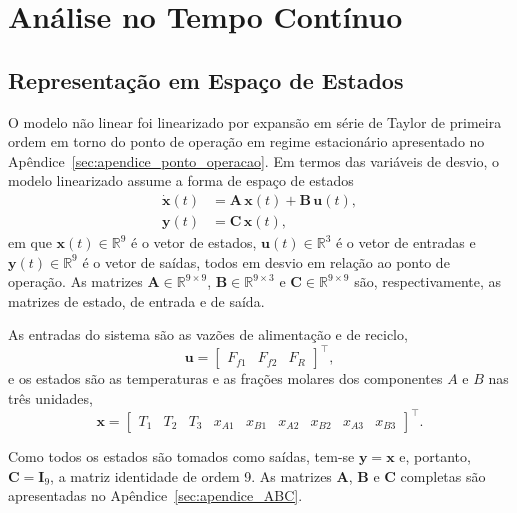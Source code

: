 \section{Análise no Tempo Contínuo}

\subsection{Representação em Espaço de Estados}

O modelo não linear foi linearizado por expansão em série de Taylor de primeira ordem em torno do ponto de operação em regime estacionário apresentado no Apêndice~\ref{sec:apendice_ponto_operacao}.
Em termos das variáveis de desvio, o modelo linearizado assume a forma de espaço de estados
\begin{align}
  \dot{\mathbf{x}}(t) & = \mathbf{A}\,\mathbf{x}(t) + \mathbf{B}\,\mathbf{u}(t), \\
  \mathbf{y}(t)       & = \mathbf{C}\,\mathbf{x}(t),
\end{align}
em que $\mathbf{x}(t) \in \mathbb{R}^{9}$ é o vetor de estados, $\mathbf{u}(t) \in \mathbb{R}^{3}$ é o vetor de entradas e $\mathbf{y}(t) \in \mathbb{R}^{9}$ é o vetor de saídas, todos em desvio em relação ao ponto de operação.
As matrizes $\mathbf{A} \in \mathbb{R}^{9 \times 9}$, $\mathbf{B} \in \mathbb{R}^{9 \times 3}$ e $\mathbf{C} \in \mathbb{R}^{9 \times 9}$ são, respectivamente, as matrizes de estado, de entrada e de saída.

As entradas do sistema são as vazões de alimentação e de reciclo,
\begin{equation}
  \mathbf{u} = \begin{bmatrix} F_{f1} & F_{f2} & F_R \end{bmatrix}^\top,
\end{equation}
e os estados são as temperaturas e as frações molares dos componentes $A$ e $B$ nas três unidades,
\begin{equation}
  \mathbf{x} = \begin{bmatrix} T_1 & T_2 & T_3 & x_{A1} & x_{B1} & x_{A2} & x_{B2} & x_{A3} & x_{B3} \end{bmatrix}^\top.
\end{equation}

Como todos os estados são tomados como saídas, tem-se $\mathbf{y} = \mathbf{x}$ e, portanto, $\mathbf{C} = \mathbf{I}_{9}$, a matriz identidade de ordem 9.
As matrizes $\mathbf{A}$, $\mathbf{B}$ e $\mathbf{C}$ completas são apresentadas no Apêndice~\ref{sec:apendice_ABC}.

